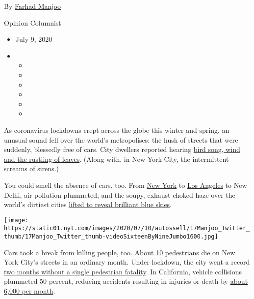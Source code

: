 By \href{https://www.nytimes.com/by/farhad-manjoo}{Farhad Manjoo}

Opinion Columnist

\begin{itemize}
\item
  July 9, 2020
\item
  \begin{itemize}
  \item
  \item
  \item
  \item
  \item
  \item
  \end{itemize}
\end{itemize}

As coronavirus lockdowns crept across the globe this winter and spring,
an unusual sound fell over the world's metropolises: the hush of streets
that were suddenly, blessedly free of cars. City dwellers reported
hearing
\href{https://www.nytimes.com/interactive/2020/05/22/upshot/coronavirus-quiet-city-noise.html}{bird
song, wind and the rustling of leaves}. (Along with, in New York City,
the intermittent screams of sirens.)

You could smell the absence of cars, too. From
\href{https://www.nydailynews.com/coronavirus/ny-corionavirus-environmental-benefit-unlikely-to-last-20200406-vx5v3dn6evhbhdjdmarcyihleu-story.html}{New
York} to
\href{https://www.lamag.com/citythinkblog/air-quality-covid/}{Los
Angeles} to New Delhi, air pollution plummeted, and the soupy,
exhaust-choked haze over the world's dirtiest cities
\href{https://www.theguardian.com/environment/2020/apr/11/positively-alpine-disbelief-air-pollution-falls-lockdown-coronavirus}{lifted
to reveal brilliant blue skies}.

\texttt{[image: https://static01.nyt.com/images/2020/07/10/autossell/17Manjoo\_Twitter\_thumb/17Manjoo\_Twitter\_thumb-videoSixteenByNineJumbo1600.jpg]}

Cars took a break from killing people, too.
\href{https://www.nytimes.com/2020/03/10/nyregion/nyc-deaths-pedestrian-cycling.html}{About
10 pedestrians} die on New York City's streets in an ordinary month.
Under lockdown, the city went a record
\href{https://www.cnn.com/2020/05/13/us/new-york-city-pedestrian-deaths/index.html}{two
months without a single pedestrian fatality}. In California, vehicle
collisions plummeted 50 percent, reducing accidents resulting in
injuries or death by
\href{https://roadecology.ucdavis.edu/files/content/projects/COVID_CHIPs_Impacts_updated_415.pdf}{about
6,000 per month}.

